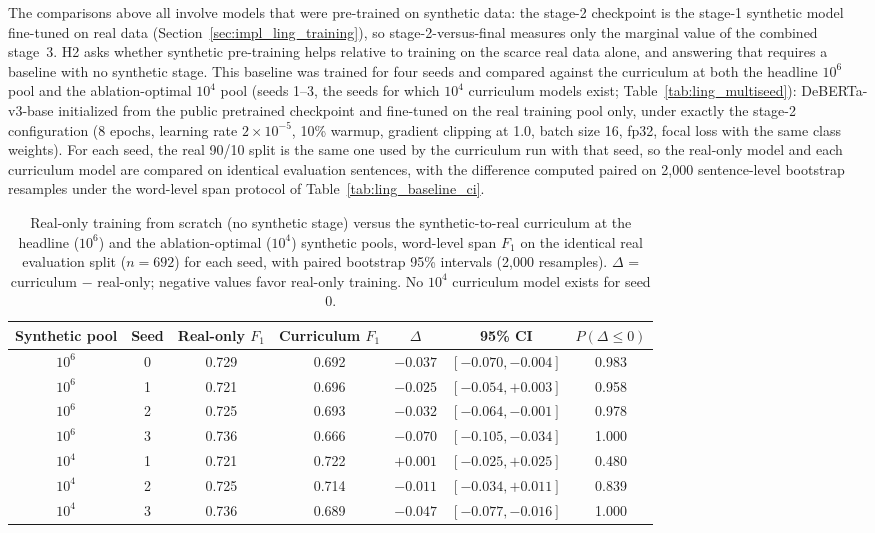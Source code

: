 The comparisons above all involve models that were pre-trained on synthetic data: the stage-2 checkpoint is the stage-1 synthetic model fine-tuned on real data (Section~\ref{sec:impl_ling_training}), so stage-2-versus-final measures only the marginal value of the combined stage~3. H2 asks whether synthetic pre-training helps relative to training on the scarce real data alone, and answering that requires a baseline with no synthetic stage. This baseline was trained for four seeds and compared against the curriculum at both the headline $10^6$ pool and the ablation-optimal $10^4$ pool (seeds 1--3, the seeds for which $10^4$ curriculum models exist; Table~\ref{tab:ling_multiseed}): DeBERTa-v3-base initialized from the public pretrained checkpoint and fine-tuned on the real training pool only, under exactly the stage-2 configuration (8 epochs, learning rate $2\times10^{-5}$, 10\% warmup, gradient clipping at 1.0, batch size 16, fp32, focal loss with the same class weights). For each seed, the real 90/10 split is the same one used by the curriculum run with that seed, so the real-only model and each curriculum model are compared on identical evaluation sentences, with the difference computed paired on 2{,}000 sentence-level bootstrap resamples under the word-level span protocol of Table~\ref{tab:ling_baseline_ci}.

\begin{table}[ht]
\centering
\caption[Real-only training from scratch versus the synthetic-to-real curriculum.]{Real-only training from scratch (no synthetic stage) versus the synthetic-to-real curriculum at the headline ($10^6$) and the ablation-optimal ($10^4$) synthetic pools, word-level span $F_1$ on the identical real evaluation split ($n=692$) for each seed, with paired bootstrap 95\% intervals (2{,}000 resamples). $\Delta$ = curriculum $-$ real-only; negative values favor real-only training. No $10^4$ curriculum model exists for seed 0.}
\label{tab:ling_scratch}
\small\setlength{\tabcolsep}{4pt}
\begin{tabular}{ccccccc}
\toprule
\textbf{Synthetic pool} & \textbf{Seed} & \textbf{Real-only $F_1$} & \textbf{Curriculum $F_1$} & \textbf{$\Delta$} & \textbf{95\% CI} & \textbf{$P(\Delta \leq 0)$} \\
\midrule
$10^6$ & 0 & 0.729 & 0.692 & $-0.037$ & $[-0.070, -0.004]$ & 0.983 \\
$10^6$ & 1 & 0.721 & 0.696 & $-0.025$ & $[-0.054, +0.003]$ & 0.958 \\
$10^6$ & 2 & 0.725 & 0.693 & $-0.032$ & $[-0.064, -0.001]$ & 0.978 \\
$10^6$ & 3 & 0.736 & 0.666 & $-0.070$ & $[-0.105, -0.034]$ & 1.000 \\
\midrule
$10^4$ & 1 & 0.721 & 0.722 & $+0.001$ & $[-0.025, +0.025]$ & 0.480 \\
$10^4$ & 2 & 0.725 & 0.714 & $-0.011$ & $[-0.034, +0.011]$ & 0.839 \\
$10^4$ & 3 & 0.736 & 0.689 & $-0.047$ & $[-0.077, -0.016]$ & 1.000 \\
\bottomrule
\end{tabular}
\end{table}

